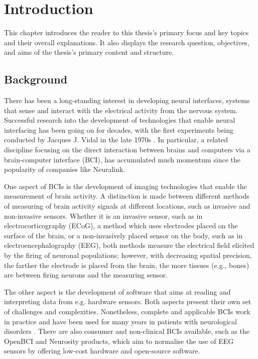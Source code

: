 \chapter{Introduction}
\graphicspath{{Chapter1/Figs/}{Chapter1/Figs/}}

This chapter introduces the reader to this thesis's primary focus and key topics and their overall explanations. It also displays the research question, objectives, and aims of the thesis's primary content and structure.

\section{Background}
\label{chapter1-background}

There has been a long-standing interest in developing neural interfaces, systems that sense and interact with the electrical activity from the nervous system. Successful research into the development of technologies that enable neural interfacing has been going on for decades, with the first experiments being conducted by Jacques J. Vidal in the late 1970s \citep{vidal_real-time_1977}. In particular, a related discipline focusing on the direct interaction between brains and computers via a brain-computer interface (BCI), has accumulated much momentum since the popularity of companies like Neuralink.

One aspect of BCIs is the development of imaging technologies that enable the measurement of brain activity. A distinction is made between different methods of measuring of brain activity signals at different locations, such as invasive and non-invasive sensors. Whether it is an invasive sensor, such as in electrocorticography (ECoG), a method which uses electrodes placed on the surface of the brain, or a non-invasively placed sensor on the body, such as in electroencephalography (EEG), both methods measure the electrical field elicited by the firing of neuronal populations; however, with decreasing spatial precision, the farther the electrode is placed from the brain, the more tissues (e.g., bones) are between firing neurons and the measuring sensor.

The other aspect is the development of software that aims at reading and interpreting data from e.g. hardware sensors. Both aspects present their own set of challenges and complexities. Nonetheless, complete and applicable BCIs work in practice and have been used for many years in patients with neurological disorders \citep{braingate_publications_nodate}. There are also consumer and non-clinical BCIs available, such as the OpenBCI and Neurosity products, which aim to normalise the use of EEG sensors by offering low-cost hardware and open-source software.

